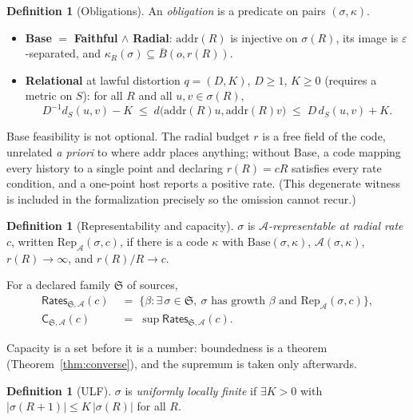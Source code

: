 \documentclass[11pt,a4paper]{article}
\theoremstyle{plain}
\theoremstyle{definition}
\newtheorem{definition}[theorem]{Definition}
\theoremstyle{remark}
\newcommand{\Rates}{\mathsf{Rates}}
\newcommand{\Capy}{\mathsf{C}}
\begin{document}
\begin{definition}[Obligations]
An \emph{obligation} is a predicate on pairs $(\sigma,\kappa)$.
\begin{itemize}
\item \textbf{Base} $=$ \textbf{Faithful} $\wedge$ \textbf{Radial}:
  $\mathrm{addr}(R)$ is injective on $\sigma(R)$, its image is
  $\varepsilon$-separated, and $\kappa_R(\sigma)\subseteq \bar B(o,r(R))$.
\item \textbf{Relational} at lawful distortion $q=(D,K)$, $D\ge 1$, $K\ge 0$
  (requires a metric on $S$): for all $R$ and all $u,v\in\sigma(R)$,
  \[
    D^{-1} d_S(u,v) - K \;\le\; d\bigl(\mathrm{addr}(R)u,\mathrm{addr}(R)v\bigr)
    \;\le\; D\, d_S(u,v) + K .
  \]
\end{itemize}
\end{definition}

Base feasibility is not optional. The radial budget $r$ is a free field of the
code, unrelated \emph{a priori} to where $\mathrm{addr}$ places anything; without
Base, a code mapping every history to a single point and declaring
$r(R)=cR$ satisfies every rate condition, and a one-point host reports a
positive rate. (This degenerate witness is included in the formalization
precisely so the omission cannot recur.)

\begin{definition}[Representability and capacity]
$\sigma$ is \emph{$\mathcal{A}$-representable at radial rate $c$}, written
$\mathrm{Rep}_{\mathcal A}(\sigma,c)$, if there is a code $\kappa$ with
$\mathrm{Base}(\sigma,\kappa)$, $\mathcal A(\sigma,\kappa)$,
$r(R)\to\infty$, and $r(R)/R\to c$.

For a declared family $\mathfrak{S}$ of sources,
\begin{align*}
  \Rates_{\mathfrak S,\mathcal A}(c)
  &\;=\;\bigl\{\beta : \exists\,\sigma\in\mathfrak S,\ \sigma \text{ has growth }
  \beta \text{ and } \mathrm{Rep}_{\mathcal A}(\sigma,c)\bigr\},\\
  \Capy_{\mathfrak S,\mathcal A}(c) &\;=\;\sup \Rates_{\mathfrak S,\mathcal A}(c).
\end{align*}
\end{definition}

Capacity is a set before it is a number: boundedness is a theorem
(Theorem~\ref{thm:converse}), and the supremum is taken only afterwards.

\begin{definition}[ULF]
$\sigma$ is \emph{uniformly locally finite} if
$\exists K>0$ with $|\sigma(R+1)| \le K\,|\sigma(R)|$ for all $R$.
\end{definition}
\end{document}
